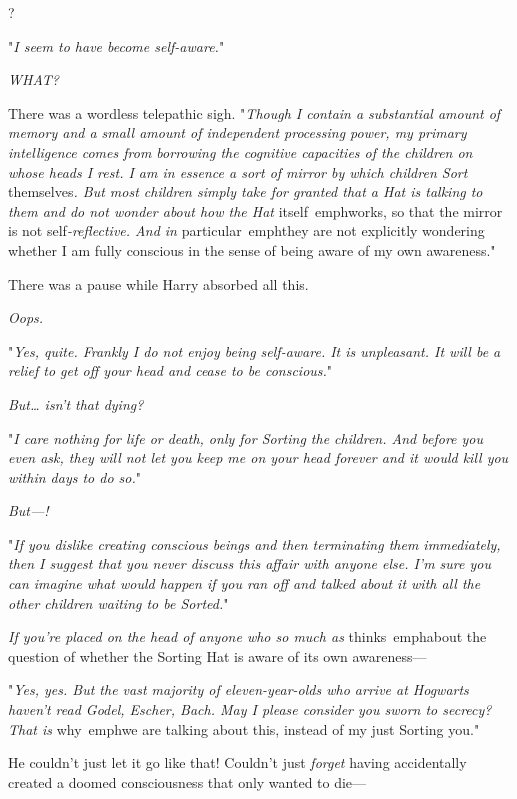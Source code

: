 
?

\quad\quad
"\emph{I seem to have become self-aware.}"

\emph{WHAT?}

There was a wordless telepathic sigh. "\emph{Though I contain a substantial 
amount of memory and a small amount of independent processing power, my primary 
intelligence comes from borrowing the cognitive capacities of the children on 
whose heads I rest. I am in essence a sort of mirror by which children Sort} 
themselves\emph{. But most children simply take for granted that a Hat is 
talking to them and do not wonder about how the Hat} itself\ emph{works, so 
that the mirror is not} self\emph{-reflective. And in} particular\ emph{they 
are not explicitly wondering whether I am fully conscious in the sense of being 
aware of my own awareness.}"

There was a pause while Harry absorbed all this.

\emph{Oops.}

"\emph{Yes, quite. Frankly I do not enjoy being self-aware. It is unpleasant. 
It will be a relief to get off your head and cease to be conscious.}"

\emph{But{\ldots} isn't that dying?}

"\emph{I care nothing for life or death, only for Sorting the children. And 
before you even ask, they will not let you keep me on your head forever and it 
would kill you within days to do so.}"

\emph{But---!}

"\emph{If you dislike creating conscious beings and then terminating them 
immediately, then I suggest that you never discuss this affair with anyone 
else. I'm sure you can imagine what would happen if you ran off and talked 
about it with all the other children waiting to be Sorted.}"

\emph{If you're placed on the head of anyone who so much as} thinks\ emph{about 
the question of whether the Sorting Hat is aware of its own awareness---}

"\emph{Yes, yes. But the vast majority of eleven-year-olds who arrive at 
Hogwarts haven't read Godel, Escher, Bach. May I please consider you sworn to 
secrecy? That is} why\ emph{we are talking about this, instead of my just 
Sorting you.}"

He couldn't just let it go like that! Couldn't just \emph{forget} having 
accidentally created a doomed consciousness that only wanted to die---

